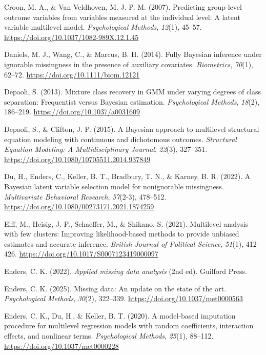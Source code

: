 \documentclass[
  letterpaper,
  11pt,
  english,
  singlespacing,
  headsepline,
  openany]{MastersDoctoralThesis}
\newlength{\cslhangindent}
\newenvironment{CSLReferences}[2] %
 {\begin{list}{}{%
  \setlength{\itemindent}{0pt}
  \setlength{\leftmargin}{0pt}
  \setlength{\parsep}{0pt}
  \ifodd #1
   \setlength{\leftmargin}{\cslhangindent}
   \setlength{\itemindent}{-1\cslhangindent}
  \fi
  \setlength{\itemsep}{#2\baselineskip}}}
 {\end{list}}
\begin{document}
\begin{CSLReferences}{1}{0}
Croon, M. A., \& Van Veldhoven, M. J. P. M. (2007). Predicting
group-level outcome variables from variables measured at the individual
level: {A} latent variable multilevel model. \emph{Psychological
Methods}, \emph{12}(1), 45--57.
\url{https://doi.org/10.1037/1082-989X.12.1.45}

Daniels, M. J., Wang, C., \& Marcus, B. H. (2014). Fully {Bayesian}
inference under ignorable missingness in the presence of auxiliary
covariates. \emph{Biometrics}, \emph{70}(1), 62--72.
\url{https://doi.org/10.1111/biom.12121}

Depaoli, S. (2013). Mixture class recovery in {GMM} under varying
degrees of class separation: {Frequentist} versus {Bayesian} estimation.
\emph{Psychological Methods}, \emph{18}(2), 186--219.
\url{https://doi.org/10.1037/a0031609}

Depaoli, S., \& Clifton, J. P. (2015). A {Bayesian} approach to
multilevel structural equation modeling with continuous and dichotomous
outcomes. \emph{Structural Equation Modeling: A Multidisciplinary
Journal}, \emph{22}(3), 327--351.
\url{https://doi.org/10.1080/10705511.2014.937849}

Du, H., Enders, C., Keller, B. T., Bradbury, T. N., \& Karney, B. R.
(2022). A {Bayesian} latent variable selection model for nonignorable
missingness. \emph{Multivariate Behavioral Research}, \emph{57}(2-3),
478--512. \url{https://doi.org/10.1080/00273171.2021.1874259}

Elff, M., Heisig, J. P., Schaeffer, M., \& Shikano, S. (2021).
Multilevel analysis with few clusters: {Improving} likelihood-based
methods to provide unbiased estimates and accurate inference.
\emph{British Journal of Political Science}, \emph{51}(1), 412--426.
\url{https://doi.org/10.1017/S0007123419000097}

Enders, C. K. (2022). \emph{Applied missing data analysis} (2nd ed).
Guilford Press.

Enders, C. K. (2025). Missing data: {An} update on the state of the art.
\emph{Psychological Methods}, \emph{30}(2), 322--339.
\url{https://doi.org/10.1037/met0000563}

Enders, C. K., Du, H., \& Keller, B. T. (2020). A model-based imputation
procedure for multilevel regression models with random coefficients,
interaction effects, and nonlinear terms. \emph{Psychological Methods},
\emph{25}(1), 88--112. \url{https://doi.org/10.1037/met0000228}


\end{CSLReferences}
\end{document}
